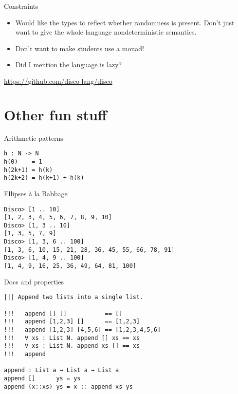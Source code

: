 \documentclass[xcolor=svgnames,12pt]{beamer}
\newenvironment{xframe}[1][]
  {\begin{frame}[fragile,environment=xframe,#1]}
  {\end{frame}}
\begin{document}

\begin{xframe}{Constraints}
  \begin{itemize}
  \item<+-> Would like the types to reflect whether randomness is
    present.  Don't just want to give the whole language
    nondeterministic semantics.
  \item<+-> Don't want to make students use a monad!
  \item<+-> Did I mention the language is lazy?
  \end{itemize}
  \begin{center}
  \end{center}
\end{xframe}

\begin{xframe}
  \begin{center}
    \url{https://github.com/disco-lang/disco}
  \end{center}
\end{xframe}

\section{Other fun stuff}

\begin{xframe}{Arithmetic patterns}
\begin{verbatim}
h : N -> N
h(0)    = 1
h(2k+1) = h(k)
h(2k+2) = h(k+1) + h(k)
\end{verbatim}
\end{xframe}

\begin{xframe}{Ellipses \`a la Babbage}
\begin{verbatim}
Disco> [1 .. 10]
[1, 2, 3, 4, 5, 6, 7, 8, 9, 10]
Disco> [1, 3 .. 10]
[1, 3, 5, 7, 9]
Disco> [1, 3, 6 .. 100]
[1, 3, 6, 10, 15, 21, 28, 36, 45, 55, 66, 78, 91]
Disco> [1, 4, 9 .. 100]
[1, 4, 9, 16, 25, 36, 49, 64, 81, 100]
\end{verbatim}
\end{xframe}

\begin{xframe}{Docs and properties}
\begin{verbatim}
||| Append two lists into a single list.

!!!   append [] []           == []
!!!   append [1,2,3] []      == [1,2,3]
!!!   append [1,2,3] [4,5,6] == [1,2,3,4,5,6]
!!!   ∀ xs : List N. append [] xs == xs
!!!   ∀ xs : List N. append xs [] == xs
!!!   append

append : List a → List a → List a
append []      ys = ys
append (x::xs) ys = x :: append xs ys
\end{verbatim}
\end{xframe}
\end{document}
